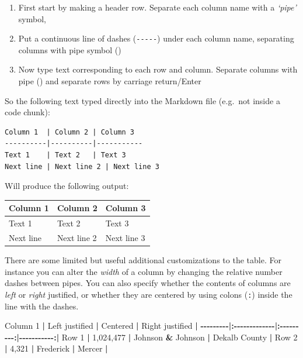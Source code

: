\documentclass[
]{book}
\newenvironment{Shaded}{\begin{snugshade}}{\end{snugshade}}
\newcommand{\DecValTok}[1]{\textcolor[rgb]{0.00,0.00,0.81}{#1}}
\newcommand{\ErrorTok}[1]{\textcolor[rgb]{0.64,0.00,0.00}{\textbf{#1}}}
\newcommand{\NormalTok}[1]{#1}
\newcommand{\SpecialCharTok}[1]{\textcolor[rgb]{0.81,0.36,0.00}{\textbf{#1}}}
\providecommand{\tightlist}{%
  \setlength{\itemsep}{0pt}\setlength{\parskip}{0pt}}
\begin{document}
\begin{enumerate}
\def\labelenumi{\arabic{enumi}.}
\tightlist
\item
  First start by making a header row. Separate each column name with a \emph{`pipe'} symbol, \texttt{\textbar{}}
\item
  Put a continuous line of dashes (\texttt{-\/-\/-\/-\/-}) under each column name, separating columns with pipe symbol (\texttt{\textbar{}})
\item
  Now type text corresponding to each row and column. Separate columns with pipe (\texttt{\textbar{}}) and separate rows by carriage return/Enter
\end{enumerate}

So the following text typed directly into the Markdown file (e.g.~not inside a code chunk):

\begin{verbatim}
Column 1  | Column 2 | Column 3
----------|----------|-----------
Text 1    | Text 2   | Text 3
Next line | Next line 2 | Next line 3
\end{verbatim}

Will produce the following output:

\begin{longtable}[]{@{}lll@{}}
\toprule\noalign{}
Column 1 & Column 2 & Column 3 \\
\midrule\noalign{}
\endhead
\bottomrule\noalign{}
\endlastfoot
Text 1 & Text 2 & Text 3 \\
Next line & Next line 2 & Next line 3 \\
\end{longtable}

There are some limited but useful additional customizations to the table. For instance you can alter the \emph{width} of a column by changing the relative number dashes between pipes. You can also specify whether the contents of columns are \emph{left} or \emph{right} justified, or whether they are centered by using colons (\texttt{:}) inside the line with the dashes.

\begin{Shaded}
\begin{Highlighting}[]
\NormalTok{Column }\DecValTok{1} \SpecialCharTok{|}\NormalTok{ Left justified }\SpecialCharTok{|}\NormalTok{ Centered }\SpecialCharTok{|}\NormalTok{ Right justified }\SpecialCharTok{|}
\SpecialCharTok{{-}{-}{-}{-}{-}{-}{-}{-}{-}}\ErrorTok{|:}\SpecialCharTok{{-}{-}{-}{-}{-}{-}{-}{-}{-}{-}{-}{-}{-}}\ErrorTok{|:}\SpecialCharTok{{-}{-}{-}{-}{-}{-}{-}{-}{-}}\ErrorTok{:|}\SpecialCharTok{{-}{-}{-}{-}{-}{-}{-}{-}{-}{-}{-}}\ErrorTok{:|}
\NormalTok{Row }\DecValTok{1}  \SpecialCharTok{|} \DecValTok{1}\NormalTok{,}\DecValTok{024}\NormalTok{,}\DecValTok{477} \SpecialCharTok{|}\NormalTok{ Johnson }\SpecialCharTok{\&}\NormalTok{ Johnson }\SpecialCharTok{|}\NormalTok{ Dekalb County }\SpecialCharTok{|}
\NormalTok{Row }\DecValTok{2} \SpecialCharTok{|} \DecValTok{4}\NormalTok{,}\DecValTok{321} \SpecialCharTok{|}\NormalTok{ Frederick }\SpecialCharTok{|}\NormalTok{ Mercer  }\SpecialCharTok{|}
\end{Highlighting}
\end{Shaded}
\end{document}
